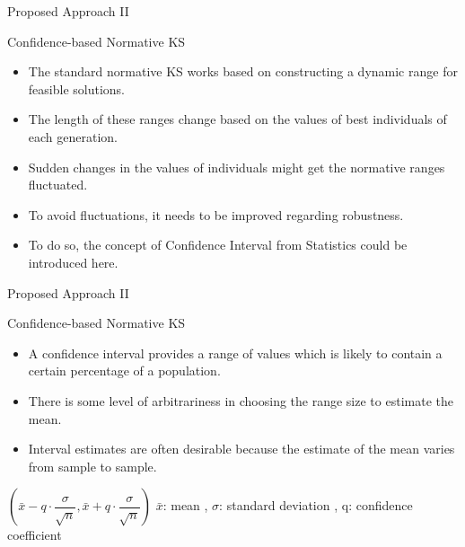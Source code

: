 \documentclass[table]{beamer}
\begin{document}
	\begin{frame}{Proposed Approach II}
		\begin{block}{Confidence-based Normative KS}
			\begin{itemize}
				\item The standard normative KS works based on constructing a dynamic range for feasible solutions.
				\item The length of these ranges change based on the values of best individuals of each generation.
				\item Sudden changes in the values of individuals might get the normative ranges fluctuated.
				\item To avoid fluctuations, it needs to be improved regarding robustness.
				\item To do so, the concept of \alert{Confidence Interval} from Statistics could be introduced here. \cite{papoulis2002probability}
			\end{itemize}
		\end{block}
	\end{frame}
	\begin{frame}{Proposed Approach II}
		\begin{block}{Confidence-based Normative KS}
			\begin{itemize}
				\item A confidence interval provides a range of values which is likely to contain a certain percentage of a population.
				\item There is some level of arbitrariness in choosing the range size to estimate the mean.
				\item Interval estimates are often desirable because the estimate of the mean varies from sample to sample.
			\end{itemize}
		\end{block}
		\begin{block}{}
			\centering
			$(\bar{x}-q\cdot\dfrac{\sigma}{\sqrt{n}} , \bar{x}+q\cdot\dfrac{\sigma}{\sqrt{n}})$\newline
			$\bar{x}$: mean , $\sigma$: standard deviation , q: confidence coefficient
		\end{block}
	\end{frame}
\end{document}
